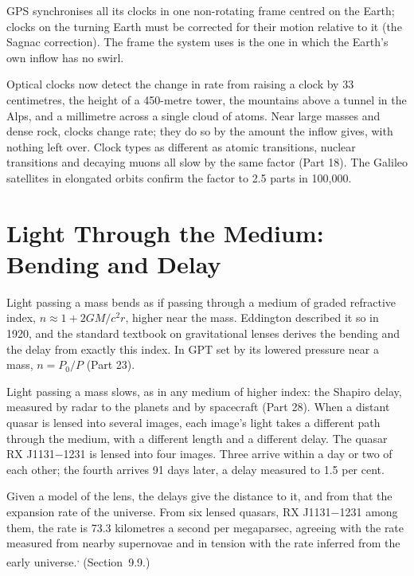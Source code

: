 \documentclass[11pt,a4paper]{article}
\begin{document}
 GPS synchronises all its clocks in one non-rotating frame centred on the Earth; clocks on the turning Earth must be corrected for their motion relative to it (the Sagnac correction). The frame the system uses is the one in which the Earth's own inflow has no swirl.

 Optical clocks now detect the change in rate from raising a clock by 33 centimetres, the height of a 450-metre tower, the mountains above a tunnel in the Alps, and a millimetre across a single cloud of atoms. Near large masses and dense rock, clocks change rate; they do so by the amount the inflow gives, with nothing left over. Clock types as different as atomic transitions, nuclear transitions and decaying muons all slow by the same factor (Part 18). The Galileo satellites in elongated orbits confirm the factor to 2.5 parts in 100,000.

\section{Light Through the Medium: Bending and Delay}

 Light passing a mass bends as if passing through a medium of graded refractive index, $n \approx 1 + 2GM/c^2 r$, higher near the mass. Eddington described it so in 1920, and the standard textbook on gravitational lenses derives the bending and the delay from exactly this index. In GPT  set by its lowered pressure near a mass, $n = P_0/P$ (Part 23).

 Light passing a mass slows, as in any medium of higher index: the Shapiro delay, measured by radar to the planets and by spacecraft (Part 28). When a distant quasar is lensed into several images, each image's light takes a different path through the medium, with a different length and a different delay. The quasar RX J1131$-$1231 is lensed into four images. Three arrive within a day or two of each other; the fourth arrives 91 days later, a delay measured to 1.5 per cent.

 Given a model of the lens, the delays give the distance to it, and from that the expansion rate of the universe. From six lensed quasars, RX J1131$-$1231 among them, the rate is 73.3 kilometres a second per megaparsec, agreeing with the rate measured from nearby supernovae and in tension with the rate inferred from the early universe.\textsuperscript{,} (Section~9.9.)
\end{document}
